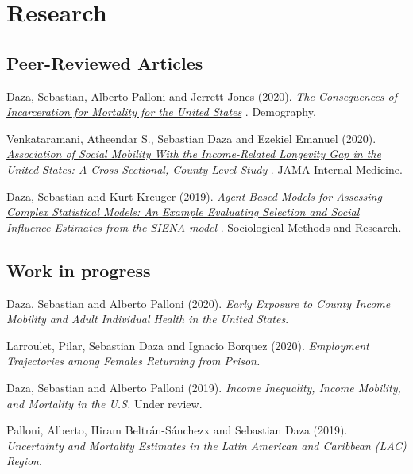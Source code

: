 \documentclass[10pt,letterpaper]{article}
\renewenvironment{itemize}{
  \begin{list}{}{
    \setlength{\leftmargin}{1.5em}
    \setlength{\itemsep}{0.25em}
    \setlength{\parskip}{0pt}
    \setlength{\parsep}{0.25em}
  }
}{
  \end{list}
}
\begin{document}
\section*{Research}

\subsection*{Peer-Reviewed Articles}

\begin{itemize}

\item Daza, Sebastian, Alberto Palloni and Jerrett Jones (2020).
  \textit{\href{https://rdcu.be/b278V}
  {The Consequences of Incarceration for Mortality for the United States}
  }.
  Demography.

\item Venkataramani, Atheendar S., Sebastian Daza and Ezekiel Emanuel (2020).
  \textit{
  \href{doi:10.1001/jamainternmed.2019.6532}
  {Association of Social Mobility With the Income-Related Longevity Gap in the United States: A Cross-Sectional, County-Level Study}
  }.
 JAMA Internal Medicine.

 \item Daza, Sebastian and Kurt Kreuger (2019).
  \textit{
  \href{https://doi.org/10.1177/0049124119826147}
  {Agent-Based Models for Assessing Complex Statistical Models: An Example Evaluating Selection and Social Influence Estimates from the SIENA model}
  }.
 Sociological Methods and Research.


\end{itemize}

\subsection*{Work in progress}

\begin{itemize}

\item Daza, Sebastian and Alberto Palloni (2020). {\textit{Early Exposure to County Income Mobility and Adult Individual Health in the United States}}.
\item Larroulet, Pilar, Sebastian Daza and Ignacio Borquez (2020). {\textit{Employment Trajectories among Females Returning from Prison.}}
\item Daza, Sebastian and Alberto Palloni (2019). {\textit{Income Inequality, Income Mobility, and Mortality in the U.S.}} Under review.
\item Palloni, Alberto, Hiram Beltrán-Sánchezx and Sebastian Daza (2019). {\textit{Uncertainty and Mortality Estimates in the Latin American and Caribbean (LAC) Region}}.

\end{itemize}
\end{document}

